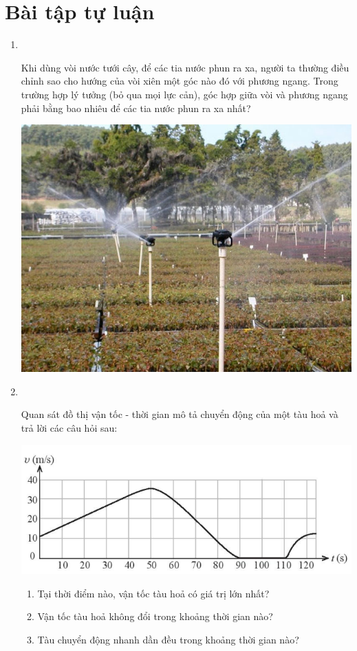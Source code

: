 \section{Bài tập tự luận}
\begin{enumerate}[label=\bfseries Bài \arabic*:]
	\item {}\\
	{Khi dùng vòi nước tưới cây, để các tia nước phun ra xa, người ta thường điều chỉnh sao cho hướng của vòi xiên một góc nào đó với phương ngang. Trong trường hợp lý tưởng (bỏ qua mọi lực cản), góc hợp giữa vòi và phương ngang phải bằng bao nhiêu để các tia nước phun ra xa nhất?
		\begin{center}
			\includegraphics[width=0.3\linewidth]{../figs/VN10-2023-PH-TP0003-11}
		\end{center}
	
}
	
	\item {}\\
	{Quan sát đồ thị vận tốc - thời gian mô tả chuyển động của một tàu hoả và trả lời các câu hỏi sau:
		\begin{center}
			\includegraphics[width=0.6\linewidth]{../figs/VN10-2023-PH-TP0003-9}
		\end{center}
	\begin{enumerate}[label=\alph*)]
		\item Tại thời điểm nào, vận tốc tàu hoả có giá trị lớn nhất?
		\item Vận tốc tàu hoả không đổi trong khoảng thời gian nào?
		\item Tàu chuyển động nhanh dần đều trong khoảng thời gian nào?
	\end{enumerate}
}




\end{enumerate}
